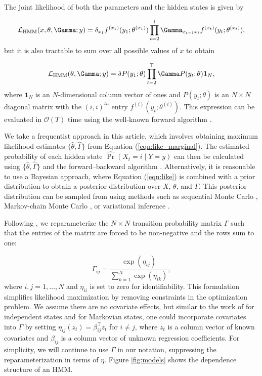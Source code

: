 The joint likelihood of both the parameters and the hidden states is given by

\begin{equation}
    \calL_{\text{HMM}}(x,\theta,\Gamma;y) = \delta_{x_1} f^{(x_1)}(y_1; \theta^{(x_1)}) \prod_{t=2}^\top \Gamma_{x_{t-1} x_t} f^{(x_t)}(y_t; \theta^{(x_t)}),
    \label{eqn:like}
\end{equation}
%
but it is also tractable to sum over all possible values of $x$ to obtain

\begin{equation}
    \calL_{\text{HMM}}(\theta,\Gamma;y) = \delta P(y_1;\theta) \prod_{t=2}^\top \Gamma P(y_t;\theta) \mathbf{1}_N,
    \label{eqn:like_marginal}
\end{equation}
%
where $\mathbf{1}_N$ is an $N$-dimensional column vector of ones and $P(y_t;\theta)$ is an $N \times N$ diagonal matrix with the $(i,i)^{th}$ entry $f^{(i)}(y_t; \theta^{(i)})$. This expression can be evaluated in $\mathcal{O}(T)$ time using the well-known forward algorithm \citep{Zucchini:2016}.

We take a frequentist approach in this article, which involves obtaining maximum likelihood estimates $\{\hat \theta, \hat \Gamma\}$ from Equation (\ref{eqn:like_marginal}). The estimated probability of each hidden state $\hat{\Pr}(X_t = i \mid Y = y)$ can then be calculated using $\{\hat \theta, \hat \Gamma\}$ and the forward--backward algorithm \citep{Zucchini:2016}. Alternatively, it is reasonable to use a Bayesian approach, where Equation (\ref{eqn:like}) is combined with a prior distribution to obtain a posterior distribution over $X$, $\theta$, and $\Gamma$. This posterior distribution can be sampled from using methods such as sequential Monte Carlo \citep{Douc:2011b}, Markov-chain Monte Carlo \citep{Scott:2002}, or variational inference \citep{Foti:2014}.
%

Following \citet{Barajas:2017}, we reparameterize the $N \times N$ transition probability matrix $\Gamma$ such that the entries of the matrix are forced to be non-negative and the rows sum to one:

\begin{equation*}
    \Gamma_{ij} = \frac{\exp(\eta_{ij})}{\sum_{k=1}^N \exp(\eta_{ik})}, 
\end{equation*}
%
where $i,j = 1,\ldots,N$ and $\eta_{ii}$ is set to zero for identifiability. This formulation simplifies likelihood maximization by removing constraints in the optimization problem. We assume there are no covariate effects, but similar to the work of \citet{DeSouza:2017} for independent states and \citet{Adam:2019} for Markovian states, one could incorporate covariates into $\Gamma$ by setting $\eta_{ij}(z_t) = \beta_{ij}^\top z_t$ for $i \neq j$, where $z_t$ is a column vector of known covariates and $\beta_{ij}$ is a column vector of unknown regression coefficients. For simplicity, we will continue to use $\Gamma$ in our notation, suppressing the reparameterization in terms of $\eta$. Figure \ref{fig:models} shows the dependence structure of an HMM.

